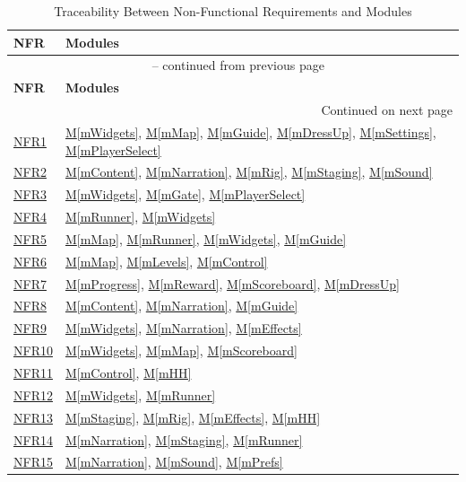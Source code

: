 \documentclass[10pt, titlepage]{article}
\newcommand{\srsurl}{https://team-hindsight.github.io/ophthamology-game/SRS/SRS.pdf}
\newcommand{\srsitemref}[2]{\href{\srsurl\#nameddest=#1}{#2}}
\newcommand{\mref}[1]{\texorpdfstring{\hyperref[md:#1]{M\ref*{#1}}}{M\ref*{#1}}}
\begin{document}
\begin{longtable}{@{}p{}p{}@{}}
\caption{Traceability Between Non-Functional Requirements and Modules}\label{TblNFRModules}\\
\toprule
\textbf{NFR} & \textbf{Modules} \\
\midrule
\endfirsthead
\multicolumn{2}{c}{\tablename\ \thetable{} -- continued from previous page} \\
\toprule
\textbf{NFR} & \textbf{Modules} \\
\midrule
\endhead
\midrule
\multicolumn{2}{r}{Continued on next page} \\
\endfoot
\bottomrule
\endlastfoot

\srsitemref{NFR_Layout}{NFR1} & \mref{mWidgets}, \mref{mMap}, \mref{mGuide}, \mref{mDressUp}, \mref{mSettings}, \mref{mPlayerSelect} \\
\srsitemref{NFR_ChildSafe}{NFR2} & \mref{mContent}, \mref{mNarration}, \mref{mRig}, \mref{mStaging}, \mref{mSound} \\
\srsitemref{NFR_TouchTarget}{NFR3} & \mref{mWidgets}, \mref{mGate}, \mref{mPlayerSelect} \\
\srsitemref{NFR_Exit}{NFR4} & \mref{mRunner}, \mref{mWidgets} \\
\srsitemref{NFR_Usability}{NFR5} & \mref{mMap}, \mref{mRunner}, \mref{mWidgets}, \mref{mGuide} \\
\srsitemref{NFR_ClinicianUse}{NFR6} & \mref{mMap}, \mref{mLevels}, \mref{mControl} \\
\srsitemref{NFR_NoPressure}{NFR7} & \mref{mProgress}, \mref{mReward}, \mref{mScoreboard}, \mref{mDressUp} \\
\srsitemref{NFR_Language}{NFR8} & \mref{mContent}, \mref{mNarration}, \mref{mGuide} \\
\srsitemref{NFR_Accessibility}{NFR9} & \mref{mWidgets}, \mref{mNarration}, \mref{mEffects} \\
\srsitemref{NFR_Colour}{NFR10} & \mref{mWidgets}, \mref{mMap}, \mref{mScoreboard} \\
\srsitemref{NFR_Startup}{NFR11} & \mref{mControl}, \mref{mHH} \\
\srsitemref{NFR_Responsiveness}{NFR12} & \mref{mWidgets}, \mref{mRunner} \\
\srsitemref{NFR_Smoothness}{NFR13} & \mref{mStaging}, \mref{mRig}, \mref{mEffects}, \mref{mHH} \\
\srsitemref{NFR_AVSync}{NFR14} & \mref{mNarration}, \mref{mStaging}, \mref{mRunner} \\
\srsitemref{NFR_AudioSafety}{NFR15} & \mref{mNarration}, \mref{mSound}, \mref{mPrefs} \\

\end{longtable}
\end{document}
